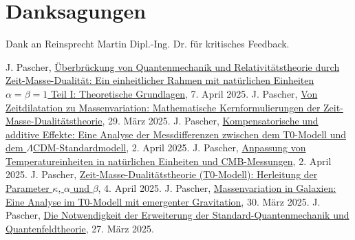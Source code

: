 \documentclass[12pt,a4paper]{article}
\newenvironment{acknowledgments}
{\section*{Danksagungen}}
{\vspace{1em}}
\begin{document}
	\begin{acknowledgments}
		Dank an Reinsprecht Martin Dipl.-Ing. Dr. für kritisches Feedback.
	\end{acknowledgments}
	
	
	\begin{thebibliography}{99}
		 J. Pascher, \href{https://github.com/jpascher/T0-Time-Mass-Duality/tree/main/2/pdf/Deutsch/Bridging Quantum Mechanics and Relativity through Time-Mass Duality Part I Theoretical Foundations.pdf}{Überbrückung von Quantenmechanik und Relativitätstheorie durch Zeit-Masse-Dualität: Ein einheitlicher Rahmen mit natürlichen Einheiten \(\alpha = \beta = 1\) Teil I: Theoretische Grundlagen}, 7. April 2025.
		 J. Pascher, \href{https://github.com/jpascher/T0-Time-Mass-Duality/tree/main/2/pdf/Deutsch/Mathematische Formulierungen der Zeit-Masse-Dualitätstheorie mit Lagrange.pdf}{Von Zeitdilatation zu Massenvariation: Mathematische Kernformulierungen der Zeit-Masse-Dualitätstheorie}, 29. März 2025.
		 J. Pascher, \href{https://github.com/jpascher/T0-Time-Mass-Duality/tree/main/2/pdf/Deutsch/Analyse der Messdifferenzen zwischen dem T0-Modell und dem Standardmodell.pdf}{Kompensatorische und additive Effekte: Eine Analyse der Messdifferenzen zwischen dem T0-Modell und dem \(\Lambda\)CDM-Standardmodell}, 2. April 2025.
		 J. Pascher, \href{https://github.com/jpascher/T0-Time-Mass-Duality/tree/main/2/pdf/Deutsch/Anpassung von Temperatureinheiten in natürlichen Einheiten und CMB-Messungen.pdf}{Anpassung von Temperatureinheiten in natürlichen Einheiten und CMB-Messungen}, 2. April 2025.
		 J. Pascher, \href{https://github.com/jpascher/T0-Time-Mass-Duality/tree/main/2/pdf/Deutsch/Zeit-Masse-Dualitätstheorie (T0-Modell) Herleitung der Parameter kappa, alpha und beta.pdf}{Zeit-Masse-Dualitätstheorie (T0-Modell): Herleitung der Parameter \(\kappa\), \(\alpha\) und \(\beta\)}, 4. April 2025.
		 J. Pascher, \href{https://github.com/jpascher/T0-Time-Mass-Duality/tree/main/2/pdf/Deutsch/Massenvariation in Galaxien.pdf}{Massenvariation in Galaxien: Eine Analyse im T0-Modell mit emergenter Gravitation}, 30. März 2025.
		 J. Pascher, \href{https://github.com/jpascher/T0-Time-Mass-Duality/tree/main/2/pdf/Deutsch/Die Notwendigkeit einer Erweiterung der Standard-Quantenmechanik und Quantenfeldtheorie.pdf}{Die Notwendigkeit der Erweiterung der Standard-Quantenmechanik und Quantenfeldtheorie}, 27. März 2025.

\end{thebibliography}
\end{document}
